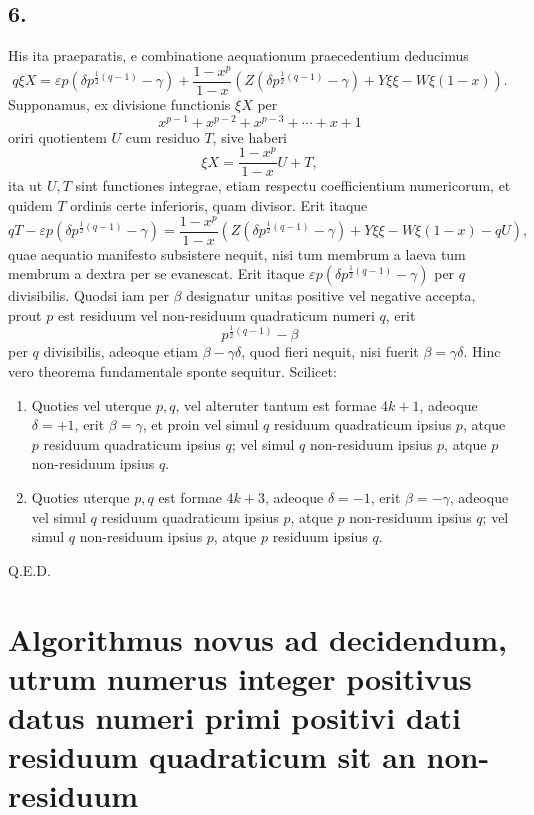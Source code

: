 \documentclass[12pt]{article}
\begin{document}
\subsection*{6.}

His ita praeparatis, e combinatione aequationum praecedentium deducimus
\[
q\xi X=\varepsilon p\left(\delta p^{\frac12(q-1)}-\gamma\right)
+\frac{1-x^p}{1-x}\left(Z\left(\delta p^{\frac12(q-1)}-\gamma\right)+Y\xi\xi-W\xi(1-x)\right).
\]
Supponamus, ex divisione functionis $\xi X$ per
\[
x^{p-1}+x^{p-2}+x^{p-3}+\cdots+x+1
\]
oriri quotientem $U$ cum residuo $T$, sive haberi
\[
\xi X=\frac{1-x^p}{1-x}U+T,
\]
ita ut $U,T$ sint functiones integrae, etiam respectu coefficientium numericorum, et quidem $T$ ordinis certe inferioris, quam divisor. Erit itaque
\[
qT-\varepsilon p\left(\delta p^{\frac12(q-1)}-\gamma\right)
=\frac{1-x^p}{1-x}\left(Z\left(\delta p^{\frac12(q-1)}-\gamma\right)+Y\xi\xi-W\xi(1-x)-qU\right),
\]
quae aequatio manifesto subsistere nequit, nisi tum membrum a laeva tum membrum a dextra per se evanescat. Erit itaque $\varepsilon p(\delta p^{\frac12(q-1)}-\gamma)$ per $q$ divisibilis. Quodsi iam per $\beta$ designatur unitas positive vel negative accepta, prout $p$ est residuum vel non-residuum quadraticum numeri $q$, erit
\[
p^{\frac12(q-1)}-\beta
\]
per $q$ divisibilis, adeoque etiam $\beta-\gamma\delta$, quod fieri nequit, nisi fuerit $\beta=\gamma\delta$. Hinc vero theorema fundamentale sponte sequitur. Scilicet:
\begin{enumerate}[label=\Roman*.]
\item Quoties vel uterque $p,q$, vel alteruter tantum est formae $4k+1$, adeoque $\delta=+1$, erit $\beta=\gamma$, et proin vel simul $q$ residuum quadraticum ipsius $p$, atque $p$ residuum quadraticum ipsius $q$; vel simul $q$ non-residuum ipsius $p$, atque $p$ non-residuum ipsius $q$.
\item Quoties uterque $p,q$ est formae $4k+3$, adeoque $\delta=-1$, erit $\beta=-\gamma$, adeoque vel simul $q$ residuum quadraticum ipsius $p$, atque $p$ non-residuum ipsius $q$; vel simul $q$ non-residuum ipsius $p$, atque $p$ residuum ipsius $q$.
\end{enumerate}
Q.E.D.

\section*{Algorithmus novus ad decidendum, utrum numerus integer positivus datus numeri primi positivi dati residuum quadraticum sit an non-residuum}
\end{document}
